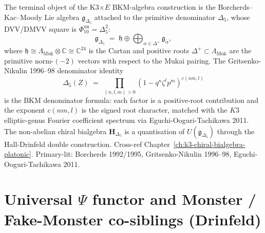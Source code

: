\begin{remark}
\label{rem:k3ebkm-bkm-cartan-delta5}
The terminal object of the K3$\times E$ BKM-algebra construction is
the Borcherds--Kac--Moody Lie algebra $\mathfrak g_{\Delta_5}$
attached to the primitive denominator \(\Delta_5\), whose DVV/DMVV square is
\(\Phi_{10}^{\mathrm{un}}=\Delta_5^2\):
\[
\mathfrak g_{\Delta_5} \;=\; \mathfrak h \oplus \bigoplus_{\alpha\in\Delta^+} \mathfrak g_\alpha,
\]
where $\mathfrak h \cong \Lambda_{\mathrm{Muk}}\otimes\mathbb C \cong \mathbb C^{24}$
is the Cartan and positive roots $\Delta^+\subset\Lambda_{\mathrm{Muk}}$
are the primitive norm-$(-2)$ vectors with respect to the Mukai pairing.
The Gritsenko-Nikulin 1996--98 denominator identity
\[
\Delta_5(Z) \;=\; \prod_{(n,l,m)>0}(1 - q^n\zeta^l p^m)^{c(nm,l)}
\]
is the BKM denominator formula: each factor is a positive-root
contribution and the exponent $c(nm,l)$ is the signed root character,
matched with the $K3$ elliptic-genus Fourier coefficient spectrum via
Eguchi-Ooguri-Tachikawa 2011. The non-abelian chiral bialgebra
$\mathbf H_{\Delta_5}$ is a quantisation of $U(\mathfrak g_{\Delta_5})$
through the Hall-Drinfeld double construction. Cross-ref
Chapter~\ref{ch:k3-chiral-bialgebra-platonic}. Primary-lit: Borcherds
1992/1995, Gritsenko-Nikulin 1996--98, Eguchi-Ooguri-Tachikawa 2011.
\end{remark}

\section{Universal \texorpdfstring{$\Psi$}{Psi} functor and Monster / Fake-Monster co-siblings (Drinfeld)}
\label{sec:k3ebkm-universal-psi-functor}

